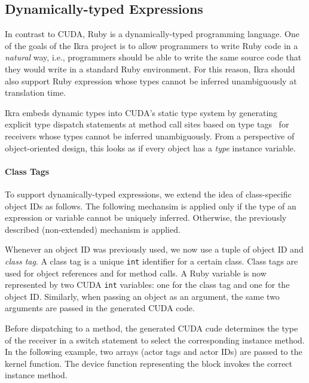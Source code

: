 \documentclass[preprint]{sigplanconf}
\begin{document}

\subsection{Dynamically-typed Expressions}
\label{sec:polymorphic}
In contrast to CUDA, Ruby is a dynamically-typed programming language. One of the goals of the Ikra project is to allow programmers to write Ruby code in a \emph{natural} way, i.e., programmers should be able to write the same source code that they would write in a standard Ruby environment. For this reason, Ikra should also support Ruby expression whose types cannot be inferred unambiguously at translation time.

Ikra embeds dynamic types into CUDA's static type system by generating explicit type dispatch statements at method call sites based on type tags~\cite{Abadi:1989:DTS:75277.75296} for receivers whose types cannot be inferred unambiguously. From a perspective of object-oriented design, this looks as if every object has a \emph{type} instance variable.

\paragraph{Class Tags}
To support dynamically-typed expressions, we extend the idea of class-specific object IDs as follows. The following mechansim is applied only if the type of an expression or variable cannot be uniquely inferred. Otherwise, the previously described (non-extended) mechanism is applied. 

Whenever an object ID was previously used, we now use a tuple of object ID and \emph{class tag}. A class tag is a unique \texttt{int} identifier for a certain class. Class tags are used for object references and for method calls. A Ruby variable is now represented by two CUDA \texttt{int} variables: one for the class tag and one for the object ID. Similarly, when passing an object as an argument, the same two arguments are passed in the generated CUDA code.

Before dispatching to a method, the generated CUDA cude determines the type of the receiver in a switch statement to select the corresponding instance method. In the following example, two arrays (actor tags and actor IDs) are passed to the kernel function. The device function representing the block invokes the correct instance method.
\end{document}
